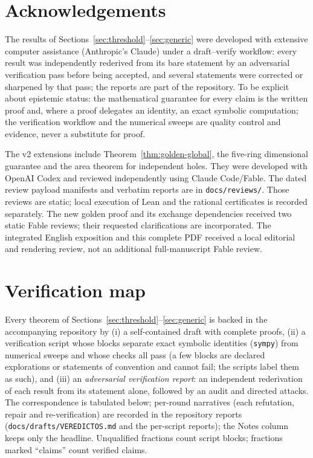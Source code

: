 \documentclass[11pt]{article}
\theoremstyle{definition}
\begin{document}
\section*{Acknowledgements}
The results of Sections~\ref{sec:threshold}--\ref{sec:generic} were developed
with extensive computer assistance (Anthropic's Claude) under a
draft--verify workflow: every result was independently rederived from its
bare statement by an adversarial verification pass before being accepted,
and several statements were corrected or sharpened by that pass; the reports
are part of the repository. To be explicit about epistemic status: the
mathematical guarantee for every claim is the written proof and, where a
proof delegates an identity, an exact symbolic computation; the verification
workflow and the numerical sweeps are quality control and evidence, never a
substitute for proof.

The v2 extensions include Theorem~\ref{thm:golden-global}, the
five-ring dimensional guarantee and the area theorem for independent holes. They
were developed with
OpenAI Codex and reviewed independently using Claude Code/Fable.
The dated review payload manifests and verbatim reports are in
\texttt{docs/reviews/}. Those reviews are static; local execution of
Lean and the rational certificates is recorded separately. The new
golden proof and its exchange dependencies received two static Fable
reviews; their requested clarifications are incorporated. The integrated
English exposition and this complete PDF received a local editorial
and rendering review, not an additional full-manuscript Fable review.

\appendix
\section{Verification map}\label{app:verifmap}

Every theorem of Sections~\ref{sec:threshold}--\ref{sec:generic} is backed in
the accompanying repository by (i) a self-contained draft with complete
proofs, (ii) a verification script whose blocks separate exact symbolic
identities (\texttt{sympy}) from numerical sweeps and whose checks all pass (a few blocks
are declared explorations or statements of convention and cannot fail;
the scripts label them as such), and (iii) an
\emph{adversarial verification report}: an independent rederivation of each
result from its statement alone, followed by an audit and directed attacks.
The correspondence is tabulated below; per-round narratives (each
refutation, repair and re-verification) are recorded in the
repository reports (\texttt{docs/drafts/VEREDICTOS.md} and the
per-script reports); the Notes column keeps only the
headline. Unqualified fractions count script blocks; fractions
marked ``claims'' count verified claims.
\end{document}
